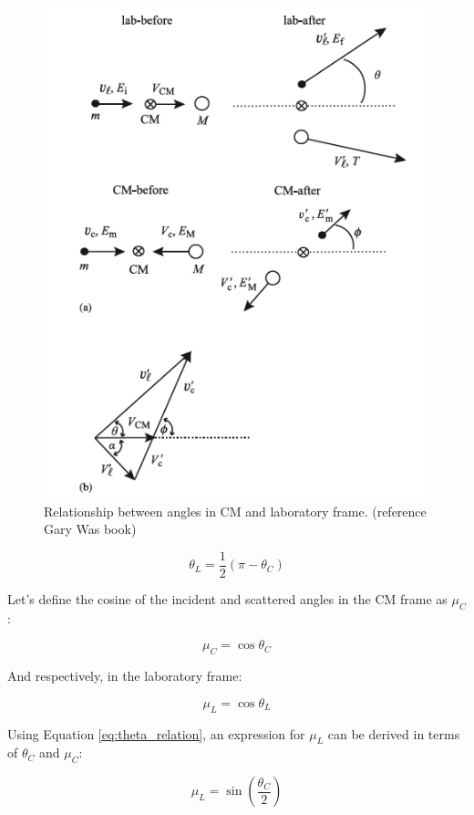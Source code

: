 \documentclass[review]{elsarticle}
\begin{document}
\begin{figure}
	\centering
	\includegraphics[width=0.8\linewidth]{triangles_GWas}
	\caption{Relationship between angles in CM and laboratory frame. (reference Gary Was book)}
	\label{fig:triangle}
\end{figure}

\begin{equation}
	\theta_L = \frac{1}{2} (\pi - \theta_C)
\label{eq:theta_relation}
\end{equation}

Let's define the cosine of the incident and scattered angles in the CM frame as $\mu_C$:

\begin{equation}
	\mu_C = \cos \theta_C
\end{equation}

And respectively, in the laboratory frame:

\begin{equation}
	\mu_L = \cos \theta_L
\end{equation}

Using Equation \ref{eq:theta_relation}, an expression for $\mu_L$ can be derived in terms of $\theta_C$ and $\mu_C$:

\begin{equation}
	\mu_L = \sin \left(\frac{\theta_C}{2}\right)
\end{equation}
\end{document}
